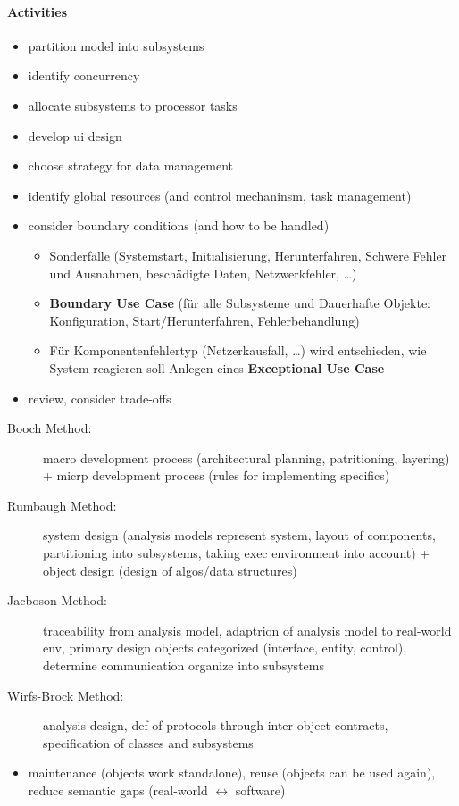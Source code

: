 \documentclass[a4paper, 10pt]{article}
\begin{document}
\paragraph{Activities}
\begin{itemize}
	\item partition model into subsystems
	\item identify concurrency
	\item allocate subsystems to processor tasks
	\item develop ui design
	\item choose strategy for data management
	\item identify global resources (and control mechaninsm, task management)
	\item consider boundary conditions (and how to be handled)
	\begin{itemize}
		\item Sonderfälle (Systemstart, Initialisierung, Herunterfahren, Schwere Fehler und Ausnahmen, beschädigte Daten, Netzwerkfehler, \dots)
		\item \follows \textbf{Boundary Use Case} (für alle Subsysteme und Dauerhafte Objekte: Konfiguration, Start/Herunterfahren, Fehlerbehandlung)
		\item Für Komponentenfehlertyp (Netzerkausfall, \dots) wird entschieden, wie System reagieren soll \follows Anlegen eines \textbf{Exceptional Use Case}
	\end{itemize}
	\item review, consider trade-offs
\end{itemize}
\begin{description}
	\item[Booch Method:] macro development process (architectural planning, patritioning, layering) + micrp development process (rules for implementing specifics)
	\item[Rumbaugh Method:] system design (analysis models represent system, layout of components, partitioning into subsystems, taking exec environment into account) + object design (design of algos/data structures)
	\item[Jacboson Method:] traceability from analysis model, adaptrion of analysis model to real-world env, primary design objects categorized (interface, entity, control), determine communication \follows organize into subsystems
	\item[Wirfs-Brock Method:] analysis \follows design, def of protocols through inter-object contracts, specification of classes and subsystems
\end{description}
\begin{itemize}
	\item maintenance (objects work standalone), reuse (objects can be used again), reduce semantic gaps (real-world $\leftrightarrow$ software)
\end{itemize}
\end{document}
